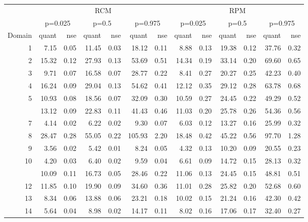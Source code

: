 
\begin{tabular}[t]{rrrrrrrrrrrrr}
\toprule
\multicolumn{1}{c}{ } & \multicolumn{6}{c}{RCM} & \multicolumn{6}{c}{RPM} \\
\cmidrule(l{3pt}r{3pt}){2-7} \cmidrule(l{3pt}r{3pt}){8-13}
\multicolumn{1}{c}{ } & \multicolumn{2}{c}{p=0.025} & \multicolumn{2}{c}{p=0.5} & \multicolumn{2}{c}{p=0.975} & \multicolumn{2}{c}{p=0.025} & \multicolumn{2}{c}{p=0.5} & \multicolumn{2}{c}{p=0.975} \\
\cmidrule(l{3pt}r{3pt}){2-3} \cmidrule(l{3pt}r{3pt}){4-5} \cmidrule(l{3pt}r{3pt}){6-7} \cmidrule(l{3pt}r{3pt}){8-9} \cmidrule(l{3pt}r{3pt}){10-11} \cmidrule(l{3pt}r{3pt}){12-13}
Domain & quant & nse & quant & nse & quant & nse & quant & nse & quant & nse & quant & nse\\
\midrule
1 & 7.15 & 0.05 & 11.45 & 0.03 & 18.12 & 0.11 & 8.88 & 0.13 & 19.38 & 0.12 & 37.76 & 0.32\\
2 & 15.32 & 0.12 & 27.93 & 0.13 & 53.69 & 0.51 & 14.34 & 0.19 & 33.14 & 0.20 & 69.60 & 0.65\\
3 & 9.71 & 0.07 & 16.58 & 0.07 & 28.77 & 0.22 & 8.41 & 0.27 & 20.27 & 0.25 & 42.23 & 0.40\\
4 & 16.24 & 0.09 & 29.04 & 0.13 & 54.62 & 0.41 & 12.12 & 0.35 & 29.12 & 0.28 & 63.78 & 0.68\\
5 & 10.93 & 0.08 & 18.56 & 0.07 & 32.09 & 0.30 & 10.59 & 0.27 & 24.45 & 0.22 & 49.29 & 0.52\\
\addlinespace
6 & 13.12 & 0.09 & 22.83 & 0.11 & 41.43 & 0.46 & 11.03 & 0.20 & 25.78 & 0.26 & 54.36 & 0.56\\
7 & 4.14 & 0.02 & 6.22 & 0.02 & 9.30 & 0.07 & 6.03 & 0.12 & 13.27 & 0.16 & 25.99 & 0.32\\
8 & 28.47 & 0.28 & 55.05 & 0.22 & 105.93 & 2.20 & 18.48 & 0.42 & 45.22 & 0.56 & 97.70 & 1.28\\
9 & 3.56 & 0.02 & 5.42 & 0.01 & 8.24 & 0.05 & 4.32 & 0.13 & 10.20 & 0.09 & 20.55 & 0.23\\
10 & 4.20 & 0.03 & 6.40 & 0.02 & 9.59 & 0.04 & 6.61 & 0.09 & 14.72 & 0.15 & 28.13 & 0.32\\
\addlinespace
11 & 10.09 & 0.11 & 16.73 & 0.05 & 28.46 & 0.22 & 11.06 & 0.13 & 24.45 & 0.15 & 48.81 & 0.51\\
12 & 11.85 & 0.10 & 19.90 & 0.09 & 34.60 & 0.36 & 11.01 & 0.28 & 25.82 & 0.20 & 52.68 & 0.60\\
13 & 8.34 & 0.06 & 13.88 & 0.06 & 23.21 & 0.18 & 10.02 & 0.15 & 21.24 & 0.16 & 42.30 & 0.42\\
14 & 5.64 & 0.04 & 8.98 & 0.02 & 14.17 & 0.11 & 8.02 & 0.16 & 17.06 & 0.17 & 32.40 & 0.27\\

\end{tabular}
